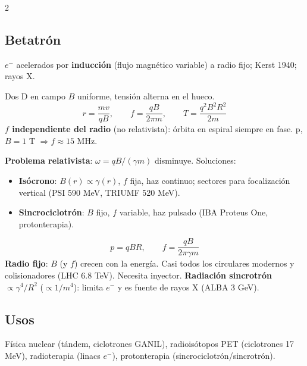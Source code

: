\documentclass[10pt,a4paper]{article}
\newcommand{\imp}[1]{\textbf{\color{BrickRed}#1}}
\begin{document}
\begin{multicols}{2}
\subsection{Betatrón}
$e^-$ acelerados por \textbf{inducción} (flujo magnético variable) a radio fijo; Kerst 1940; rayos X.
\columnbreak
\begin{clave}[Ciclotrón]
Dos D en campo $B$ uniforme, tensión alterna en el hueco.
\[ r=\frac{mv}{qB},\qquad f=\frac{qB}{2\pi m},\qquad T=\frac{q^2B^2R^2}{2m} \]
\imp{$f$ independiente del radio} (no relativista): órbita en espiral siempre en fase. p, $B=1$ T $\Rightarrow f\approx15$ MHz.
\end{clave}
\textbf{Problema relativista}: $\omega=qB/(\gamma m)$ disminuye. Soluciones:
\begin{itemize}
\item \textbf{Isócrono}: $B(r)\propto\gamma(r)$, $f$ fija, haz continuo; sectores para focalización vertical (PSI 590 MeV, TRIUMF 520 MeV).
\item \textbf{Sincrociclotrón}: $B$ fijo, $f$ variable, haz pulsado (IBA Proteus One, protonterapia).
\end{itemize}
\begin{clave}[Sincrotrón]
\[ p=qBR,\qquad f=\frac{qB}{2\pi\gamma m} \]
\textbf{Radio fijo}: $B$ (y $f$) crecen con la energía. Casi todos los circulares modernos y colisionadores (LHC 6.8 TeV). Necesita inyector.
\textbf{Radiación sincrotrón} $\propto\gamma^4/R^2$ ($\propto1/m^4$): limita $e^-$ y es fuente de rayos X (ALBA 3 GeV).
\end{clave}
\subsection{Usos}
Física nuclear (tándem, ciclotrones GANIL), radioisótopos PET (ciclotrones 17 MeV), radioterapia (linacs $e^-$), protonterapia (sincrociclotrón/sincrotrón).
\end{multicols}
\newpage

\end{document}
